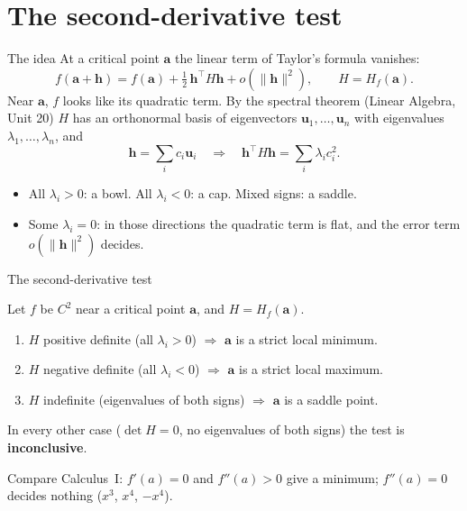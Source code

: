 \documentclass[10pt]{wosm-slides}
\newcommand{\norm}[1]{\lVert #1 \rVert}
\newcommand{\va}{\mathbf{a}}
\newcommand{\vh}{\mathbf{h}}
\newcommand{\vu}{\mathbf{u}}
\begin{document}
\section{The second-derivative test}

\begin{frame}{The idea}
  At a critical point $\va$ the linear term of Taylor's formula vanishes:
  \[ f(\va + \vh) = f(\va) + \tfrac12\, \vh^\top H \vh + o(\norm{\vh}^2), \qquad H = H_f(\va) . \]
  \pause
  Near $\va$, $f$ looks like its quadratic term. By the spectral theorem (Linear Algebra, Unit 20)
  $H$ has an orthonormal basis of eigenvectors $\vu_1, \dots, \vu_n$ with eigenvalues
  $\lambda_1, \dots, \lambda_n$, and
  \[ \vh = \sum_i c_i \vu_i \quad\Longrightarrow\quad \vh^\top H \vh = \sum_i \lambda_i c_i^2 . \]
  \pause
  \begin{itemize}
    \item All $\lambda_i > 0$: a bowl. All $\lambda_i < 0$: a cap. Mixed signs: a saddle.
    \item Some $\lambda_i = 0$: in those directions the quadratic term is flat, and the error term
      $o(\norm{\vh}^2)$ decides.
  \end{itemize}
\end{frame}

\begin{frame}{The second-derivative test}
  \begin{theorem}
    Let $f$ be $C^2$ near a critical point $\va$, and $H = H_f(\va)$.
    \begin{enumerate}
      \item $H$ positive definite (all $\lambda_i > 0$) $\Rightarrow$ $\va$ is a strict local minimum.
      \item $H$ negative definite (all $\lambda_i < 0$) $\Rightarrow$ $\va$ is a strict local maximum.
      \item $H$ indefinite (eigenvalues of both signs) $\Rightarrow$ $\va$ is a saddle point.
    \end{enumerate}
    In every other case ($\det H = 0$, no eigenvalues of both signs) the test is
    \textbf{inconclusive}.
  \end{theorem}
  \pause
  {\small Compare Calculus~I: $f'(a) = 0$ and $f''(a) > 0$ give a minimum; $f''(a) = 0$ decides
  nothing ($x^3$, $x^4$, $-x^4$).\par}
\end{frame}
\end{document}
